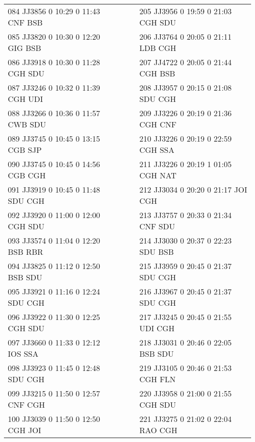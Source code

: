 \begin{scriptsize}
\begin{longtable}{l c c l}
084 JJ3856 0 10:29 0 11:43 CNF BSB & & & 205 JJ3956 0 19:59 0 21:03 CGH SDU \\

085 JJ3820 0 10:30 0 12:20 GIG BSB & & & 206 JJ3764 0 20:05 0 21:11 LDB CGH \\

086 JJ3918 0 10:30 0 11:28 CGH SDU & & & 207 JJ4722 0 20:05 0 21:44 CGH BSB \\

087 JJ3246 0 10:32 0 11:39 CGH UDI & & & 208 JJ3957 0 20:15 0 21:08 SDU CGH \\

088 JJ3266 0 10:36 0 11:57 CWB SDU & & & 209 JJ3226 0 20:19 0 21:36 CGH CNF \\

089 JJ3745 0 10:45 0 13:15 CGB SJP & & & 210 JJ3226 0 20:19 0 22:59 CGH SSA \\

090 JJ3745 0 10:45 0 14:56 CGB CGH & & & 211 JJ3226 0 20:19 1 01:05 CGH NAT \\

091 JJ3919 0 10:45 0 11:48 SDU CGH & & & 212 JJ3034 0 20:20 0 21:17 JOI CGH \\

092 JJ3920 0 11:00 0 12:00 CGH SDU & & & 213 JJ3757 0 20:33 0 21:34 CNF SDU \\

093 JJ3574 0 11:04 0 12:20 BSB RBR & & & 214 JJ3030 0 20:37 0 22:23 SDU BSB \\

094 JJ3825 0 11:12 0 12:50 BSB SDU & & & 215 JJ3959 0 20:45 0 21:37 SDU CGH \\

095 JJ3921 0 11:16 0 12:24 SDU CGH & & & 216 JJ3967 0 20:45 0 21:37 SDU CGH \\

096 JJ3922 0 11:30 0 12:25 CGH SDU & & & 217 JJ3245 0 20:45 0 21:55 UDI CGH \\

097 JJ3660 0 11:33 0 12:12 IOS SSA & & & 218 JJ3031 0 20:46 0 22:05 BSB SDU \\

098 JJ3923 0 11:45 0 12:48 SDU CGH & & & 219 JJ3105 0 20:46 0 21:53 CGH FLN \\

099 JJ3215 0 11:50 0 12:57 CNF CGH & & & 220 JJ3958 0 21:00 0 21:55 CGH SDU \\

100 JJ3039 0 11:50 0 12:50 CGH JOI & & & 221 JJ3275 0 21:02 0 22:04 RAO CGH \\


\end{longtable}
\end{scriptsize}
